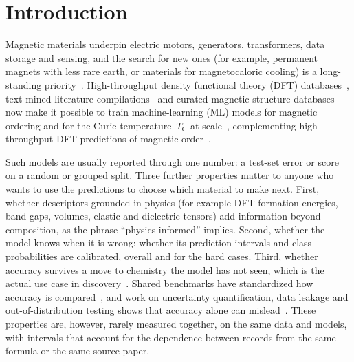 \documentclass[pdflatex,sn-nature]{sn-jnl}
\newcommand{\Tc}{\ensuremath{T_\mathrm{C}}}
\begin{document}
\maketitle

\section{Introduction}\label{sec:intro}

Magnetic materials underpin electric motors, generators, transformers, data storage and sensing, and the search for new ones (for example, permanent magnets with less rare earth, or materials for magnetocaloric cooling) is a long-standing priority~\cite{gutfleisch2011magnetic,coey2010magnetism}. High-throughput density functional theory (DFT) databases~\cite{jain2013materials,saal2013oqmd,kirklin2015oqmd,choudhary2020jarvis,curtarolo2012aflow}, text-mined literature compilations~\cite{court2018curie,itani2025nemad} and curated magnetic-structure databases~\cite{gallego2016magndata} now make it possible to train machine-learning (ML) models for magnetic ordering and for the Curie temperature~\Tc{} at scale~\cite{nelson2019curie,belot2023curie,abediorang2026curie}, complementing high-throughput DFT predictions of magnetic order~\cite{horton2019ordering,frey2020oxides}.

Such models are usually reported through one number: a test-set error or score on a random or grouped split. Three further properties matter to anyone who wants to use the predictions to choose which material to make next. First, whether descriptors grounded in physics (for example DFT formation energies, band gaps, volumes, elastic and dielectric tensors) add information beyond composition, as the phrase ``physics-informed'' implies. Second, whether the model knows when it is wrong: whether its prediction intervals and class probabilities are calibrated, overall and for the hard cases. Third, whether accuracy survives a move to chemistry the model has not seen, which is the actual use case in discovery~\cite{meredig2018extrapolation,li2023critical}. Shared benchmarks have standardized how accuracy is compared~\cite{dunn2020matbench}, and work on uncertainty quantification, data leakage and out-of-distribution testing shows that accuracy alone can mislead~\cite{tran2020uq,kapoor2023leakage,li2023critical}. These properties are, however, rarely measured together, on the same data and models, with intervals that account for the dependence between records from the same formula or the same source paper.
\end{document}
